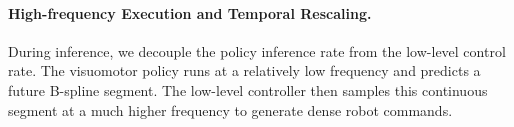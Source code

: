 










\paragraph{High-frequency Execution and Temporal Rescaling.}
During inference, we decouple the policy inference rate from the low-level control rate. The visuomotor policy runs at a relatively low frequency and predicts a future B-spline segment. The low-level controller then samples this continuous segment at a much higher frequency to generate dense robot commands.

